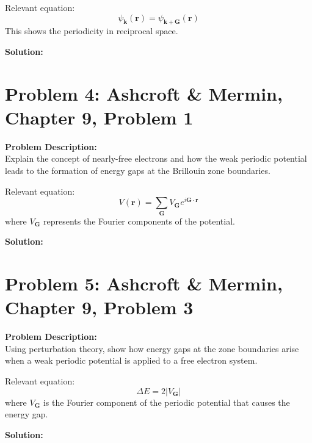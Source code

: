 \documentclass[12pt]{article}
\begin{document}
Relevant equation:
\begin{equation}
\psi_{\mathbf{k}}(\mathbf{r}) = \psi_{\mathbf{k} + \mathbf{G}}(\mathbf{r})
\end{equation}
This shows the periodicity in reciprocal space.

\vspace{2em}
\noindent \textbf{Solution:} \\
\vspace{10em}

\section*{Problem 4: Ashcroft \& Mermin, Chapter 9, Problem 1}
\noindent \textbf{Problem Description:} \\
Explain the concept of nearly-free electrons and how the weak periodic potential leads to the formation of energy gaps at the Brillouin zone boundaries.

Relevant equation:
\begin{equation}
V(\mathbf{r}) = \sum_{\mathbf{G}} V_{\mathbf{G}} e^{i \mathbf{G} \cdot \mathbf{r}}
\end{equation}
where \( V_{\mathbf{G}} \) represents the Fourier components of the potential.

\vspace{2em}
\noindent \textbf{Solution:} \\
\vspace{10em}

\section*{Problem 5: Ashcroft \& Mermin, Chapter 9, Problem 3}
\noindent \textbf{Problem Description:} \\
Using perturbation theory, show how energy gaps at the zone boundaries arise when a weak periodic potential is applied to a free electron system.

Relevant equation:
\begin{equation}
\Delta E = 2 | V_{\mathbf{G}} |
\end{equation}
where \( V_{\mathbf{G}} \) is the Fourier component of the periodic potential that causes the energy gap.

\vspace{2em}
\noindent \textbf{Solution:} \\
\vspace{10em}
\end{document}
